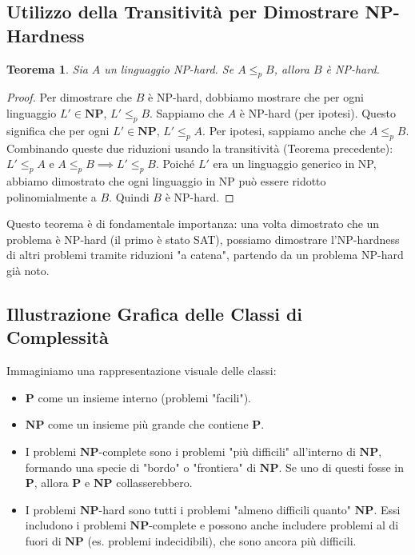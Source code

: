 \documentclass[a4paper]{article}
\newtheorem{theorem}{Teorema}
\begin{document}
\subsection{Utilizzo della Transitivit\`a per Dimostrare NP-Hardness}

\begin{theorem}
Sia $A$ un linguaggio NP-hard. Se $A \le_p B$, allora $B$ è NP-hard.
\end{theorem}

\begin{proof}
Per dimostrare che $B$ è NP-hard, dobbiamo mostrare che per ogni linguaggio $L' \in \mathbf{NP}$, $L' \le_p B$.
Sappiamo che $A$ è NP-hard (per ipotesi). Questo significa che per ogni $L' \in \mathbf{NP}$, $L' \le_p A$.
Per ipotesi, sappiamo anche che $A \le_p B$.
Combinando queste due riduzioni usando la transitività (Teorema precedente): $L' \le_p A$ e $A \le_p B \implies L' \le_p B$.
Poiché $L'$ era un linguaggio generico in NP, abbiamo dimostrato che ogni linguaggio in NP può essere ridotto polinomialmente a $B$. Quindi $B$ è NP-hard.
\end{proof}

Questo teorema è di fondamentale importanza: una volta dimostrato che un problema è NP-hard (il primo è stato SAT), possiamo dimostrare l'NP-hardness di altri problemi tramite riduzioni "a catena", partendo da un problema NP-hard già noto.

\subsection{Illustrazione Grafica delle Classi di Complessità}

Immaginiamo una rappresentazione visuale delle classi:
\begin{itemize}
    \item $\mathbf{P}$ come un insieme interno (problemi "facili").
    \item $\mathbf{NP}$ come un insieme più grande che contiene $\mathbf{P}$.
    \item I problemi $\mathbf{NP}$-complete sono i problemi "più difficili" all'interno di $\mathbf{NP}$, formando una specie di "bordo" o "frontiera" di $\mathbf{NP}$. Se uno di questi fosse in $\mathbf{P}$, allora $\mathbf{P}$ e $\mathbf{NP}$ collasserebbero.
    \item I problemi $\mathbf{NP}$-hard sono tutti i problemi "almeno difficili quanto" $\mathbf{NP}$. Essi includono i problemi $\mathbf{NP}$-complete e possono anche includere problemi al di fuori di $\mathbf{NP}$ (es. problemi indecidibili), che sono ancora più difficili.
\end{itemize}
\end{document}
